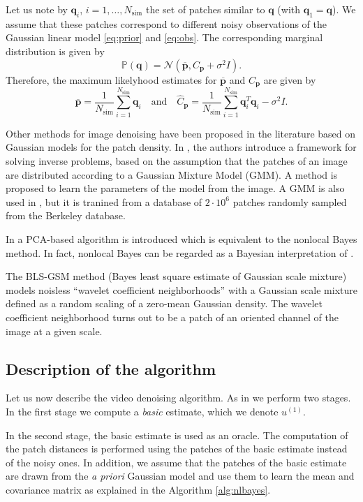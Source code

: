 \documentclass{llncs}
\newcommand{\ma}[1]{\boldsymbol{#1}}
\begin{document}
Let us note by $\ma q_i$, $i = 1, \dots, N_{\text{sim}}$ the set of patches
similar to $\ma q$ (with $\ma q_1 = \ma q$). We assume that these 
patches correspond to different noisy observations of the Gaussian linear model
\eqref{eq:prior} and \eqref{eq:obs}. The corresponding marginal distribution is given by
\[\mathds P(\ma q) = \mathcal N(\overline{\ma p}, C_{\ma p} + \sigma^2I). \]
Therefore, the maximum likelyhood estimates for $\overline{\ma p}$ and $C_{\ma
p}$ are given by 
\begin{equation}
	\widehat{\overline{\ma p}} = \frac1{N_{\text{sim}}}\sum_{i = 1}^{N_{\text{sim}}}\ma q_i \quad\text{and}\quad 
		\widehat C_{\ma p}= \frac1{N_\text{sim}}\sum_{i = 1}^{N_{\text{sim}}}\ma q_i^T\ma q_i - \sigma^2I.
	\label{eq:learn_parameters}
\end{equation}

Other methods for image denoising have been proposed in the
literature based on Gaussian models for the patch density. In \cite{Yu2012},
the authors introduce a framework for solving inverse problems, based on the
assumption that the patches of an image are distributed according to a Gaussian
Mixture Model (GMM). A method is proposed to learn the parameters of the model from
the image. A GMM is also used in \cite{Zoran2011}, but it is tranined from a
database of $2\cdot 10^6$ patches randomly sampled from the Berkeley database.

In \cite{Zhang2010} a PCA-based algorithm is introduced which is equivalent to 
the nonlocal Bayes method. In fact, nonlocal Bayes can be regarded as a Bayesian 
interpretation of \cite{Zhang2010}.

The BLS-GSM method \cite{Portilla2003} (Bayes least square estimate of Gaussian
scale mixture) models noisless ``wavelet coefficient neighborhoods'' with a
Gaussian scale mixture defined as a random scaling of a zero-mean Gaussian
density. The wavelet coefficient neighborhood turns out to be a patch of an
oriented channel of the image at a given scale.


\subsection{Description of the algorithm}

Let us now describe the video denoising algorithm. As in
\cite{Dabov2007tip,Dabov2007v,Maggioni2012,Lebrun2013a} we perform two stages.
In the first
stage we compute a \emph{basic} estimate, which we denote $u^{(1)}$. 

In the second stage, the basic estimate is used as an oracle. The computation
of the patch distances is performed using the patches of the basic estimate
instead of the noisy ones. In addition, we assume that the patches of the basic estimate
are drawn from the \textit{a priori} Gaussian model and use them to learn the mean and
covariance matrix as explained in the Algorithm \ref{alg:nlbayes}.
\end{document}
